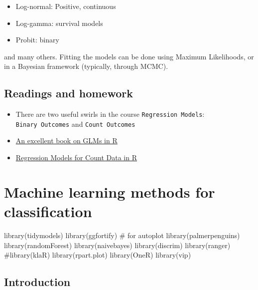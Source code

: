 \documentclass[
  letterpaper,
  DIV=11,
  numbers=noendperiod]{scrreprt}
\newenvironment{Shaded}{\begin{snugshade}}{\end{snugshade}}
\newcommand{\NormalTok}[1]{\textcolor[rgb]{0.00,0.23,0.31}{#1}}
\providecommand{\tightlist}{%
  \setlength{\itemsep}{0pt}\setlength{\parskip}{0pt}}\usepackage{longtable,booktabs,array}
\begin{document}
\begin{itemize}
\tightlist
\item
  Log-normal: Positive, continuous
\item
  Log-gamma: survival models
\item
  Probit: binary
\end{itemize}

and many others. Fitting the models can be done using Maximum
Likelihoods, or in a Bayesian framework (typically, through MCMC).

\section{Readings and homework}\label{readings-and-homework}

\begin{itemize}
\tightlist
\item
  There are two useful swirls in the course \texttt{Regression\ Models}:
  \texttt{Binary\ Outcomes} and \texttt{Count\ Outcomes}
\item
  \href{https://link.springer.com/book/10.1007/978-1-4419-0118-7}{An
  excellent book on GLMs in R}
\item
  \href{https://cran.r-project.org/web/packages/pscl/vignettes/countreg.pdf}{Regression
  Models for Count Data in R}
\end{itemize}


\chapter{Machine learning methods for
classification}\label{machine-learning-methods-for-classification}

\begin{Shaded}
\begin{Highlighting}[]
\NormalTok{library(tidymodels)}
\NormalTok{library(ggfortify) \# for autoplot}
\NormalTok{library(palmerpenguins)}
\NormalTok{library(randomForest)}
\NormalTok{library(naivebayes)}
\NormalTok{library(discrim)}
\NormalTok{library(ranger)}
\NormalTok{\#library(klaR)}
\NormalTok{library(rpart.plot)}
\NormalTok{library(OneR)}
\NormalTok{library(vip)}
\end{Highlighting}
\end{Shaded}

\section{Introduction}\label{introduction-1}
\end{document}
